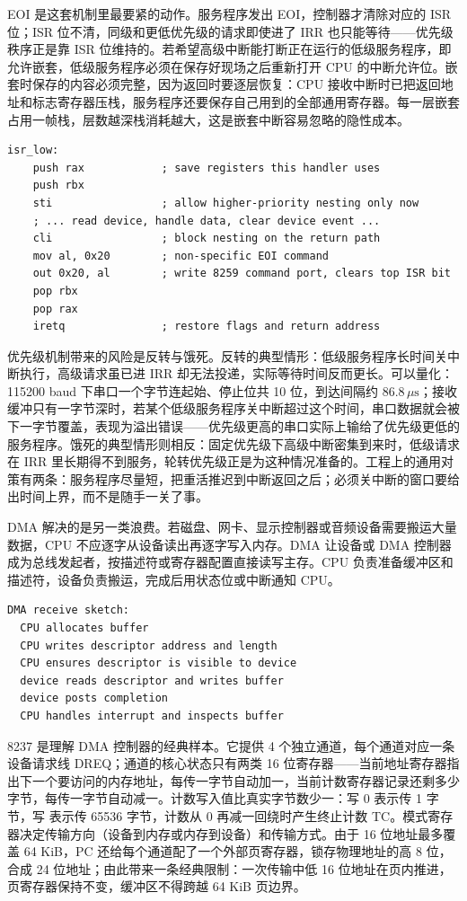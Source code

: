 EOI 是这套机制里最要紧的动作。服务程序发出 EOI，控制器才清除对应的 ISR 位；ISR 位不清，同级和更低优先级的请求即使进了 IRR 也只能等待——优先级秩序正是靠 ISR 位维持的。若希望高级中断能打断正在运行的低级服务程序，即允许嵌套，低级服务程序必须在保存好现场之后重新打开 CPU 的中断允许位。嵌套时保存的内容必须完整，因为返回时要逐层恢复：CPU 接收中断时已把返回地址和标志寄存器压栈，服务程序还要保存自己用到的全部通用寄存器。每一层嵌套占用一帧栈，层数越深栈消耗越大，这是嵌套中断容易忽略的隐性成本。

\begin{lstlisting}
isr_low:
    push rax            ; save registers this handler uses
    push rbx
    sti                 ; allow higher-priority nesting only now
    ; ... read device, handle data, clear device event ...
    cli                 ; block nesting on the return path
    mov al, 0x20        ; non-specific EOI command
    out 0x20, al        ; write 8259 command port, clears top ISR bit
    pop rbx
    pop rax
    iretq               ; restore flags and return address
\end{lstlisting}

优先级机制带来的风险是反转与饿死。反转的典型情形：低级服务程序长时间关中断执行，高级请求虽已进 IRR 却无法投递，实际等待时间反而更长。可以量化：115200 baud 下串口一个字节连起始、停止位共 10 位，到达间隔约 $86.8\,\mu\text{s}$；接收缓冲只有一字节深时，若某个低级服务程序关中断超过这个时间，串口数据就会被下一字节覆盖，表现为溢出错误——优先级更高的串口实际上输给了优先级更低的服务程序。饿死的典型情形则相反：固定优先级下高级中断密集到来时，低级请求在 IRR 里长期得不到服务，轮转优先级正是为这种情况准备的。工程上的通用对策有两条：服务程序尽量短，把重活推迟到中断返回之后；必须关中断的窗口要给出时间上界，而不是随手一关了事。

DMA 解决的是另一类浪费。若磁盘、网卡、显示控制器或音频设备需要搬运大量数据，CPU 不应逐字从设备读出再逐字写入内存。DMA 让设备或 DMA 控制器成为总线发起者，按描述符或寄存器配置直接读写主存。CPU 负责准备缓冲区和描述符，设备负责搬运，完成后用状态位或中断通知 CPU。

\begin{lstlisting}
DMA receive sketch:
  CPU allocates buffer
  CPU writes descriptor address and length
  CPU ensures descriptor is visible to device
  device reads descriptor and writes buffer
  device posts completion
  CPU handles interrupt and inspects buffer
\end{lstlisting}

8237 是理解 DMA 控制器的经典样本。它提供 4 个独立通道，每个通道对应一条设备请求线 DREQ；通道的核心状态只有两类 16 位寄存器——当前地址寄存器指出下一个要访问的内存地址，每传一字节自动加一，当前计数寄存器记录还剩多少字节，每传一字节自动减一。计数写入值比真实字节数少一：写 0 表示传 1 字节，写  表示传 65536 字节，计数从 0 再减一回绕时产生终止计数 TC。模式寄存器决定传输方向（设备到内存或内存到设备）和传输方式。由于 16 位地址最多覆盖 64 KiB，PC 还给每个通道配了一个外部页寄存器，锁存物理地址的高 8 位，合成 24 位地址；由此带来一条经典限制：一次传输中低 16 位地址在页内推进，页寄存器保持不变，缓冲区不得跨越 64 KiB 页边界。

